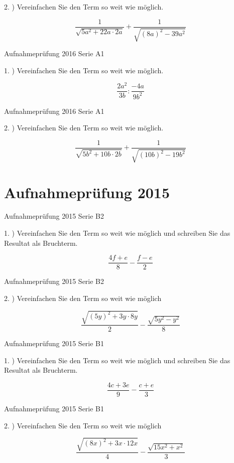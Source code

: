 2. ) Vereinfachen Sie den Term so weit wie möglich. 

$$\frac1{\sqrt{5a^2+22a\cdot{}2a}} + \frac1{\sqrt{(8a)^2-39a^2}}$$


Aufnahmeprüfung 2016 Serie A1

1. ) Vereinfachen Sie den Term so weit wie möglich. 

$$\frac{2a^2}{3b} : \frac{-4a}{9b^2}$$


Aufnahmeprüfung 2016 Serie A1

2. ) Vereinfachen Sie den Term so weit wie möglich. 

$$\frac1{\sqrt{5b^2+10b\cdot{}2b}} + \frac1{\sqrt{(10b)^2-19b^2}}$$

\section*{Aufnahmeprüfung 2015}
Aufnahmeprüfung 2015 Serie B2

1. ) Vereinfachen Sie den Term so weit wie möglich und schreiben Sie
das Resultat als Bruchterm.

$$\frac{4f+e}8 - \frac{f-e}2$$

Aufnahmeprüfung 2015 Serie B2

2. ) Vereinfachen Sie den Term so weit wie möglich

$$\frac{\sqrt{(5y)^2+3y\cdot{}8y}}2 - \frac{\sqrt{5y^2-y^2}}8$$

Aufnahmeprüfung 2015 Serie B1

1. ) Vereinfachen Sie den Term so weit wie möglich und schreiben Sie
das Resultat als Bruchterm.

$$\frac{4c+3e}{9} - \frac{c+e}{3}$$

Aufnahmeprüfung 2015 Serie B1

2. ) Vereinfachen Sie den Term so weit wie möglich

$$\frac{\sqrt{(8x)^2+3x\cdot{}12x}}4 - \frac{\sqrt{15x^2+x^2}}3$$

